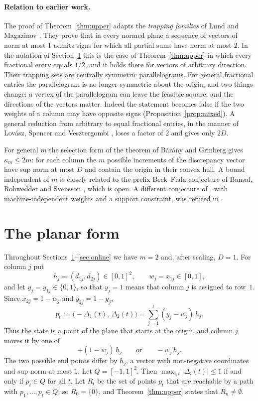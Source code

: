 \documentclass[11pt]{article}
\theoremstyle{definition}
\newcommand{\disc}{\Delta}
\begin{document}
\paragraph{Relation to earlier work.}
The proof of Theorem~\ref{thm:upper} adapts the \emph{trapping families}
of Lund and Magazinov \citep{LundMagazinov2015}.  They prove that in every
normed plane a sequence of vectors of norm at most $1$ admits signs for
which all partial sums have norm at most $2$.  In the notation of
Section~\ref{sec:planar} this is the case of Theorem~\ref{thm:upper} in
which every fractional entry equals $1/2$, and it holds there for vectors
of arbitrary direction.  Their trapping sets are centrally symmetric
parallelograms.  For general fractional entries the parallelogram is no
longer symmetric about the origin, and two things change: a vertex of the
parallelogram can leave the feasible square, and the directions of the
vectors matter.  Indeed the statement becomes false if the two weights of
a column may have opposite signs (Proposition~\ref{prop:mixed}).  A
general reduction from arbitrary to equal fractional entries, in the
manner of Lov\'asz, Spencer and Vesztergombi
\citep{LovaszSpencerVesztergombi1986}, loses a factor of $2$ and gives
only $2D$.

For general $m$ the selection form of the theorem of B\'ar\'any and
Grinberg \citep{BaranyGrinberg1981,Barany2008} gives $\kappa_m\le 2m$: for
each column the $m$ possible increments of the discrepancy vector have
sup norm at most $D$ and contain the origin in their convex hull.  A
bound independent of $m$ is closely related to the prefix Beck--Fiala
conjecture of Bansal, Rohwedder and Svensson
\citep{BansalRohwedderSvensson2022}, which is open.  A different
conjecture of \citep{LiuReis2026}, with machine-independent weights and a
support constraint, was refuted in \citep{BercziLiuReisTarnawski2026}.

\section{The planar form}\label{sec:planar}

Throughout Sections~\ref{sec:planar}--\ref{sec:online} we have $m=2$ and,
after scaling, $D=1$.  For column $j$ put
\[
 h_j=(d_{1j},d_{2j})\in[0,1]^2,\qquad w_j=x_{1j}\in[0,1],
\]
and let $y_j=y_{1j}\in\{0,1\}$, so that $y_j=1$ means that column $j$ is
assigned to row~$1$.  Since $x_{2j}=1-w_j$ and $y_{2j}=1-y_j$,
\[
 p_t:=\bigl(-\disc_1(t),\,\disc_2(t)\bigr)=\sum_{j=1}^{t}(y_j-w_j)\,h_j .
\]
Thus the state is a point of the plane that starts at the origin, and
column $j$ moves it by one of
\[
 +(1-w_j)\,h_j\qquad\text{or}\qquad -w_j\,h_j .
\]
The two possible end points differ by $h_j$, a vector with non-negative
coordinates and sup norm at most $1$.  Let $Q=[-1,1]^2$.  Then
$\max_{i,t}|\disc_i(t)|\le1$ if and only if $p_t\in Q$ for all $t$.  Let
$R_t$ be the set of points $p_t$ that are reachable by a path with
$p_1,\dots,p_t\in Q$; so $R_0=\{0\}$, and Theorem~\ref{thm:upper} states
that $R_n\ne\emptyset$.
\end{document}
